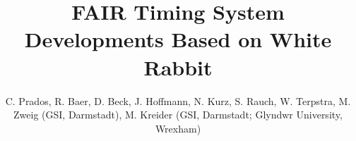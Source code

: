 \documentclass{JAC2003}
\begin{document}
\title{FAIR Timing System Developments Based on White Rabbit}

\author{C. Prados, R. Baer, D. Beck, J. Hoffmann, N. Kurz, S. Rauch, W. Terpstra, M. \\
Zweig (GSI, Darmstadt), M. Kreider (GSI, Darmstadt; Glyndwr University, \\
Wrexham)}
\maketitle








\end{document}
